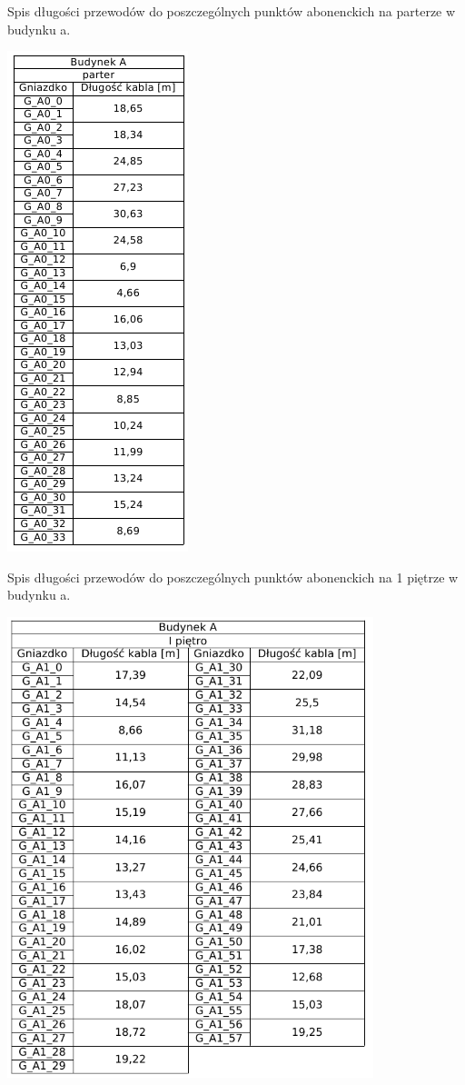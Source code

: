 \documentclass{report}
\begin{document}
\begin{table}[H]
\caption{Spis długości przewodów do poszczególnych punktów abonenckich na parterze w budynku a.}
 \centering
      \includegraphics{./obrazki/dl_kable/a0.png}
\end{table}

\begin{table}[H]
\caption{Spis długości przewodów do poszczególnych punktów abonenckich na 1 piętrze w budynku a.}
 \centering
      \includegraphics[width=0.8\textwidth]{./obrazki/dl_kable/a1.png}
\end{table}
\end{document}
